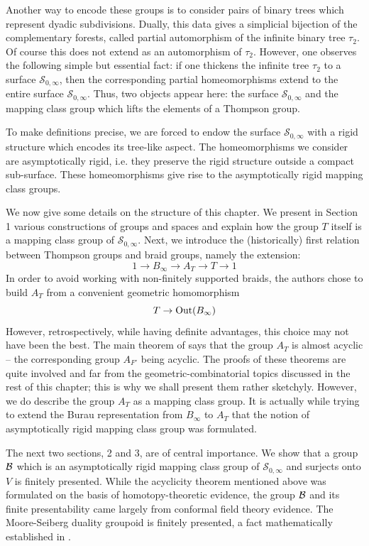 \documentclass[twoside]{irmaems}
\theoremstyle{plain}
\theoremstyle{definition}
\theoremstyle{remark}
\newcommand{\si}{{\mathscr{S}}_{0,\infty}}
\newcommand{\B}{{{\cal B}}}
\begin{document}
\vspace{0.1cm}\noindent 
Another way to encode these groups is to consider pairs of binary trees
which represent dyadic subdivisions. Dually, this data gives a simplicial
bijection of the complementary forests, 
called partial automorphism of the infinite
binary tree $\tau_2$. Of course this does not extend as an automorphism of
$\tau_2$. However, one
observes the following simple but essential fact: if one thickens the
infinite tree $\tau_2$ to a surface $\si$, 
then the corresponding partial
homeomorphisms extend to the entire surface $\si$. 
Thus, two objects
appear here: the surface $\si$  and the mapping class group 
which lifts the elements of a Thompson group.
 
 \vspace{0.1cm}\noindent     
To make definitions precise, we are forced to endow the surface 
$\si$ with a
rigid structure which encodes its tree-like aspect. 
The homeomorphisms we
consider are asymptotically rigid, i.e. they preserve the rigid structure
outside a compact sub-surface. These homeomorphisms give rise to the
asymptotically rigid mapping class groups.

\vspace{0.1cm}\noindent 
We now give some details on the structure of this chapter.
We present in Section 1 various constructions of groups and spaces and
explain how the group $T$ itself is a mapping class group of 
$\si$. Next, we
introduce the (historically) first relation between Thompson groups and braid
groups, namely the extension:
\[ 1\to B_{\infty}\to A_T \to T \to 1 \]
In order to avoid working with non-finitely supported braids, the authors
chose to build $A_T$ from a convenient geometric homomorphism
\[  T\to {\rm Out}(B_{\infty})\]
However, retrospectively, while having definite advantages, this choice may
not have been the best.
The main theorem of \cite{gr-se} 
says that the group $A_T$ is almost acyclic -- the
corresponding group $A_{F'}$ being acyclic. The proofs of these 
theorems are quite
involved and far from the geometric-combinatorial topics  
discussed in the rest of
this chapter; this is why we shall present them rather sketchyly. However, we do
describe the group $A_T$ as a mapping class group. It is actually 
while trying to extend the Burau representation from 
$B_{\infty}$ to $A_T$ that the notion of
asymptotically rigid mapping class group was formulated.


\vspace{0.1cm}\noindent 
The next two sections, 2 and 3, are of central importance. 
We show that a group $\B$
which is an asymptotically rigid 
mapping class group of $\si$ and surjects onto $V$ is finitely presented.
While the acyclicity theorem mentioned above was formulated 
on the basis of homotopy-theoretic evidence, 
the group $\B$ and its finite presentability came largely
from conformal field theory  evidence. The Moore-Seiberg 
duality groupoid is finitely presented, a fact
mathematically established in \cite{ba-ki1,ba-ki2,fu-ge}.
\end{document}

